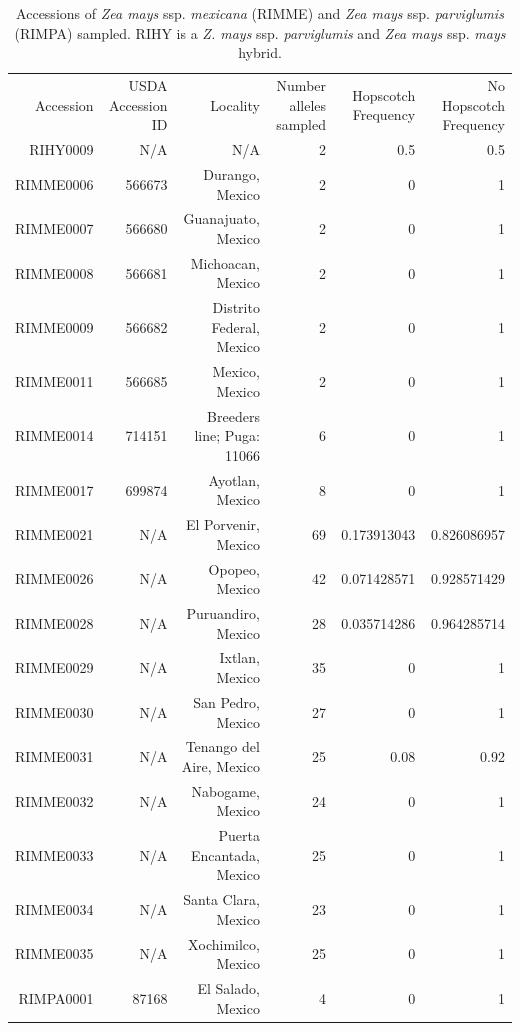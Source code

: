 \documentclass[12pt]{article}
\begin{document}
\begin{table}[htbp]
  \centering
  \caption{Accessions of \emph{Zea mays} ssp. \emph{mexicana} (RIMME) and \emph{Zea mays} ssp. \emph{parviglumis} (RIMPA) sampled. RIHY is a \emph{Z. mays} ssp. \emph{parviglumis} and \emph{Zea mays} ssp. \emph{mays} hybrid. }
    \begin{tabular}{rrrrrr}
    Accession & USDA Accession ID & Locality & Number alleles sampled & Hopscotch Frequency & No Hopscotch Frequency \\
    RIHY0009 & N/A   & N/A   & 2     & 0.5   & 0.5 \\
    RIMME0006 & 566673 & Durango, Mexico & 2     & 0     & 1 \\
    RIMME0007 & 566680 & Guanajuato, Mexico & 2     & 0     & 1 \\
    RIMME0008 & 566681 & Michoacan, Mexico & 2     & 0     & 1 \\
    RIMME0009 & 566682 & Distrito Federal, Mexico & 2     & 0     & 1 \\
    RIMME0011 & 566685 & Mexico, Mexico & 2     & 0     & 1 \\
    RIMME0014 & 714151 & Breeders line; Puga: 11066 & 6     & 0     & 1 \\
    RIMME0017 & 699874 & Ayotlan, Mexico & 8     & 0     & 1 \\
    RIMME0021 & N/A   & El Porvenir, Mexico & 69    & 0.173913043 & 0.826086957 \\
    RIMME0026 & N/A   & Opopeo, Mexico & 42    & 0.071428571 & 0.928571429 \\
    RIMME0028 & N/A   & Puruandiro, Mexico & 28    & 0.035714286 & 0.964285714 \\
    RIMME0029 & N/A   & Ixtlan, Mexico & 35    & 0     & 1 \\
    RIMME0030 & N/A   & San Pedro, Mexico & 27    & 0     & 1 \\
    RIMME0031 & N/A   & Tenango del Aire, Mexico & 25    & 0.08  & 0.92 \\
    RIMME0032 & N/A   & Nabogame, Mexico & 24    & 0     & 1 \\
    RIMME0033 & N/A   & Puerta Encantada, Mexico & 25    & 0     & 1 \\
    RIMME0034 & N/A   & Santa Clara, Mexico & 23    & 0     & 1 \\
    RIMME0035 & N/A   & Xochimilco, Mexico & 25    & 0     & 1 \\
    RIMPA0001 & 87168 & El Salado, Mexico & 4     & 0     & 1 \\

\end{tabular}
\end{table}
\end{document}
